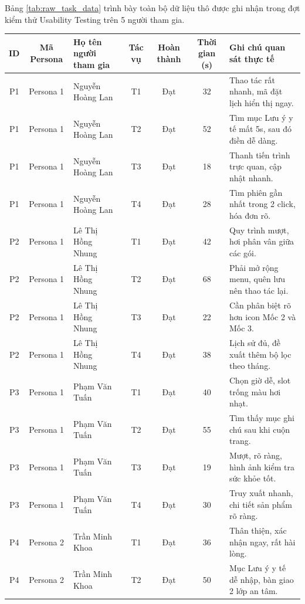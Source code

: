 Bảng \ref{tab:raw_task_data} trình bày toàn bộ dữ liệu thô được ghi nhận trong đợt kiểm thử Usability Testing trên 5 người tham gia.

\begin{table}[H]
  \centering
  \scriptsize
  \renewcommand{\arraystretch}{1.1}
  \begin{tabularx}{\textwidth}{|c|c|l|c|c|c|X|}
    \hline
    \textbf{ID} & \textbf{Mã Persona} & \textbf{Họ tên người tham gia} & \textbf{Tác vụ} & \textbf{Hoàn thành} & \textbf{Thời gian (s)} & \textbf{Ghi chú quan sát thực tế} \\ \hline
    P1 & Persona 1 & Nguyễn Hoàng Lan & T1 & Đạt & 32 & Thao tác rất nhanh, mã đặt lịch hiển thị ngay. \\ \hline
    P1 & Persona 1 & Nguyễn Hoàng Lan & T2 & Đạt & 52 & Tìm mục Lưu ý y tế mất 5s, sau đó điền dễ dàng. \\ \hline
    P1 & Persona 1 & Nguyễn Hoàng Lan & T3 & Đạt & 18 & Thanh tiến trình trực quan, cập nhật nhanh. \\ \hline
    P1 & Persona 1 & Nguyễn Hoàng Lan & T4 & Đạt & 28 & Tìm phiên gần nhất trong 2 click, hóa đơn rõ. \\ \hline
    P2 & Persona 1 & Lê Thị Hồng Nhung & T1 & Đạt & 42 & Quy trình mượt, hơi phân vân giữa các gói. \\ \hline
    P2 & Persona 1 & Lê Thị Hồng Nhung & T2 & Đạt & 68 & Phải mở rộng menu, quên lưu nên thao tác lại. \\ \hline
    P2 & Persona 1 & Lê Thị Hồng Nhung & T3 & Đạt & 22 & Cần phân biệt rõ hơn icon Mốc 2 và Mốc 3. \\ \hline
    P2 & Persona 1 & Lê Thị Hồng Nhung & T4 & Đạt & 38 & Lịch sử đủ, đề xuất thêm bộ lọc theo tháng. \\ \hline
    P3 & Persona 1 & Phạm Văn Tuấn & T1 & Đạt & 40 & Chọn giờ dễ, slot trống màu hơi nhạt. \\ \hline
    P3 & Persona 1 & Phạm Văn Tuấn & T2 & Đạt & 55 & Tìm thấy mục ghi chú sau khi cuộn trang. \\ \hline
    P3 & Persona 1 & Phạm Văn Tuấn & T3 & Đạt & 19 & Mượt, rõ ràng, hình ảnh kiểm tra sức khỏe tốt. \\ \hline
    P3 & Persona 1 & Phạm Văn Tuấn & T4 & Đạt & 30 & Truy xuất nhanh, chi tiết sản phẩm rõ ràng. \\ \hline
    P4 & Persona 2 & Trần Minh Khoa & T1 & Đạt & 36 & Thân thiện, xác nhận ngay, rất hài lòng. \\ \hline
    P4 & Persona 2 & Trần Minh Khoa & T2 & Đạt & 50 & Mục Lưu ý y tế dễ nhập, bàn giao 2 lớp an tâm. \\ \hline

\end{tabularx}
\end{table}
